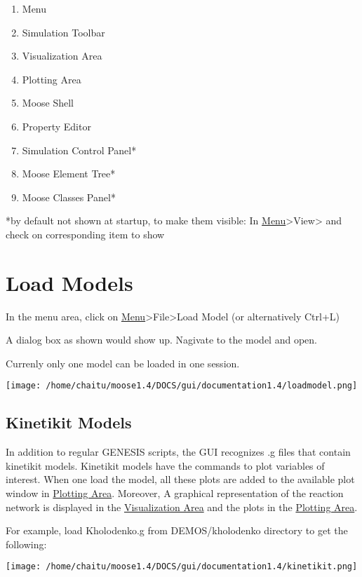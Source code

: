 \documentclass[11pt]{article}
\begin{document}
\begin{enumerate}
\item Menu
\item Simulation Toolbar
\item Visualization Area
\item Plotting Area
\item Moose Shell
\item Property Editor
\item Simulation Control Panel*
\item Moose Element Tree*
\item Moose Classes Panel*
\end{enumerate}
  
  *by default not shown at startup, to make them visible: In \hyperref[sec-2]{Menu}>View> and check on corresponding item to show  
\newpage

\section{Load Models}
\label{sec-3}


  In the menu area, click on \hyperref[sec-2]{Menu}>File>Load Model (or alternatively Ctrl+L)

  A dialog box as shown would show up. Nagivate to the model and open.

  Currenly only one model can be loaded in one session.
  
  \texttt{[image: /home/chaitu/moose1.4/DOCS/gui/documentation1.4/loadmodel.png]}

\subsection{Kinetikit Models}
\label{sec-3.1}


   In addition to regular GENESIS scripts, the GUI recognizes .g files that contain kinetikit models. Kinetikit models have the commands to plot variables of interest. When one load the model, all these plots are added to the available plot window in \hyperref[sec-2]{Plotting Area}. Moreover,  A graphical representation of the reaction network is displayed in the \hyperref[sec-2]{Visualization Area} and the plots in the \hyperref[sec-2]{Plotting Area}. 
   
   For example, load Kholodenko.g from DEMOS/kholodenko directory to get the following:

  \texttt{[image: /home/chaitu/moose1.4/DOCS/gui/documentation1.4/kinetikit.png]}
\end{document}
